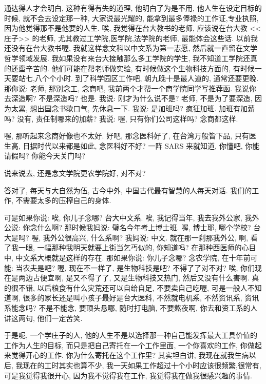 \documentclass[11pt]{article}
\begin{document}
通达得人才会明白, 这种有得有失的道理, 他明白了为是不用, 他人生在设定目标的时候, 就不会去设定那一种, 大家说最光耀的, 能拿到最多俸禄的工作证,专业执照, 因为他觉得那不是他要的人生. 唉, 我觉得在台大教书的老师, 应该说在台大教 <<庄子>> 的老师, 尤其教过工学院,医学院,法学院的老师, 最能体会这些话. 以前我还没有在台大教书喔, 我就这样念文科以中文系为第一志愿, 然后就一直留在文学哲学领域发展. 我如果没有来台大接触那么多工学院的学生, 我不知道工学院还真的还蛮辛苦的. 他们可能在帮老师做实验, 有时候做这个生物科技方面的, 有时候一天要站七,八个个小时. 到了科学园区工作吧, 朝九晚十是最人道的, 通常还要更晚. 那你说: 老师, 那别念工, 念商吧, 我前两个才帮一个商学院同学写推荐函. 我说你去深造啊? 不是深造吗? 也是. 我说: 刚才为什么说不是? 老师, 不是为了要深造, 因为太累, 想出国念书歇口气, 先休息一下. 我说: 是加班吗? 疯狂加班. 加班有加薪吗? 没有, 责任制哪来的加薪? 我说: 喔, 只有你们公司这样吗? 念商都这样. 

喔, 那听起来念商好像也不太好. 好吧, 那念医科好了, 在台湾万般皆下品, 只有医生高, 日据时代以来都是如此, 念医科好不好? 一阵 SARS 来就知道, 你懂吧, 你能请假吗? 你能今天关门吗? 

说来说去, 还是念文学院更农学院好, 对不对? 

答对了, 每天与大自然为伍, 古今中外, 中国古代最有智慧的人每天对话. 我们的工作, 不需要太多的压榨自己的身体. 

可是如果你说: 唉, 你儿子念哪? 台大中文系. 唉, 我记得当年, 我去我外公家, 我外公说: 你念什么啊? 那时候我妈说: 璧名今年考上博士班. 喔, 博士耶, 哪个学校? 台大是吗? 喔, 我外公很高兴, 什么系啊? 我妈说: 中文. 就在那一刹那我外公, 啊, 看了我一眼, 一幅那种我明天就要上街当乞丐似的, 你知道吗? 在那种西医师的心目中, 中文系大概就是这样的存在. 那如果你说: 你儿子念哪? 念农学院, 在十年前可能: 当农夫是吧? 喔, 现在不一样了, 是生物科技是吧? 不得了了对不对? 唉, 你们现在是两边占便宜啊, 是又不得了了, 又是生物科技又热门, 然后又没有什么害啊. 真的很不错, 以后粮食有什么灾荒还可以自给自足, 不要卖自己吃喔, 可是一般人不知道啊, 很多的家长还是叫小孩子最好是台大医科, 不然就电机系, 不然资讯系, 资讯系能念吗? 不是不能念, 要顶头悬哪, 随时打电脑, 不要熬夜啊, 你去和资工系的人讲这两句, 他们一定苦笑. 

{\color{purple} 于是呢, 一个学庄子的人, 他的人生不是以选择那一种自己能发挥最大工具价值的工作为人生的目标, 而只是把自己寄托在一个工作里面, 一个你喜欢的工作, 你做起来觉得开心的工作.} 你为什么寄托在这个工作里? 其实坦白讲, 我现在就我生病以后, 我现在的工时其实也算不少, 我一天如果工作超过十个小时应该很频繁,很常有, 可是我觉得我很开心, 因为我不觉得我在工作, 我觉得我在做我很感兴趣的事情. 
\end{document}
